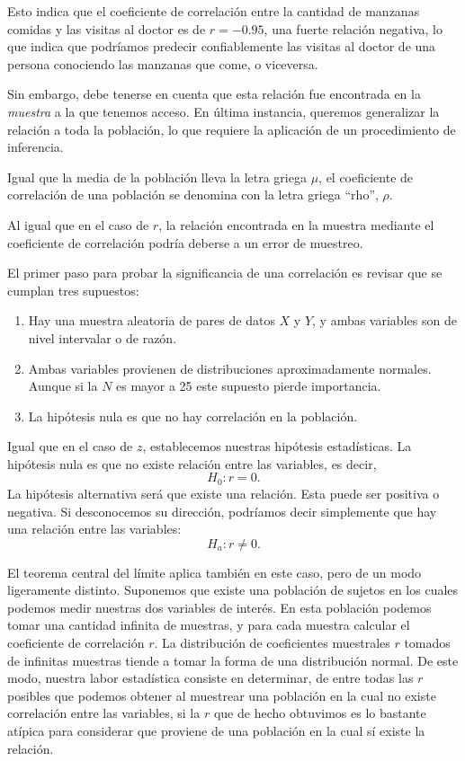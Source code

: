 \documentclass[a4paper,12pt]{article}
\begin{document}
Esto indica que el coeficiente de correlación entre la cantidad de manzanas comidas y las visitas al doctor es de $r = -0.95$, una fuerte relación negativa, lo que indica que podríamos predecir confiablemente las visitas al doctor de una persona conociendo las manzanas que come, o viceversa.

Sin embargo, debe tenerse en cuenta que esta relación fue encontrada en la {\slshape muestra} a la que tenemos acceso. En última instancia, queremos generalizar la relación a toda la población, lo que requiere la aplicación de un procedimiento de inferencia.

Igual que la media de la población lleva la letra griega $\mu$, el coeficiente de correlación de una población se denomina con la letra griega ``rho'', $\rho$.

Al igual que en el caso de $r$, la relación encontrada en la muestra mediante el coeficiente de correlación podría deberse a un error de muestreo.

El primer paso para probar la significancia de una correlación es revisar que se cumplan tres supuestos:
\begin{enumerate}
  \item Hay una muestra aleatoria de pares de datos $X$ y $Y$, y ambas variables son de nivel intervalar o de razón.
  \item Ambas variables provienen de distribuciones aproximadamente normales. Aunque si la $N$ es mayor a 25 este supuesto pierde importancia.
  \item La hipótesis nula es que no hay correlación en la población.
\end{enumerate}

Igual que en el caso de $z$, establecemos nuestras hipótesis estadísticas. La hipótesis nula es que no existe relación entre las variables, es decir,
\[
  H_{0}: r = 0
.\]
La hipótesis alternativa será que existe una relación. Esta puede ser positiva o negativa. Si desconocemos su dirección, podríamos decir simplemente que hay una relación entre las variables:
\[
  H_{a}: r \neq 0
.\]

El teorema central del límite aplica también en este caso, pero de un modo ligeramente distinto. Suponemos que existe una población de sujetos en los cuales podemos medir nuestras dos variables de interés. En esta población podemos tomar una cantidad infinita de muestras, y para cada muestra calcular el coeficiente de correlación $r$. La distribución de coeficientes muestrales $r$ tomados de infinitas muestras tiende a tomar la forma de una distribución normal. De este modo, nuestra labor estadística consiste en determinar, de entre todas las $r$ posibles que podemos obtener al muestrear una población en la cual no existe correlación entre las variables, si la $r$ que de hecho obtuvimos es lo bastante atípica para considerar que proviene de una población en la cual sí existe la relación.
\end{document}
